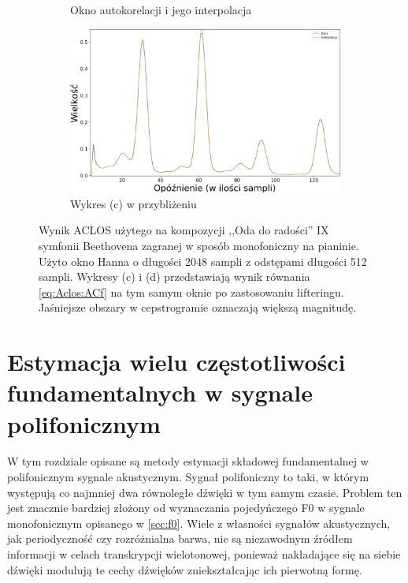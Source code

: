 \documentclass[12pt,a4paper,twoside]{mwart}
\begin{document}
\begin{figure}[H]
\begin{subfigure}{0.5\textwidth}
    \caption{Okno autokorelacji i jego interpolacja}
  \end{subfigure}
  \begin{subfigure}{0.49\textwidth}
    \centering
    \includegraphics[width=1.\linewidth]{images/ACLOS/Interpolacja_superzoomed_cropped.png}
    \caption{Wykres (c) w przybliżeniu}
  \end{subfigure}
  \caption{Wynik ACLOS użytego na kompozycji ,,Oda do radości'' IX symfonii Beethovena zagranej w sposób monofoniczny na pianinie. Użyto okno Hanna o długości 2048 sampli z odstępami długości 512 sampli. Wykresy (c) i (d) przedstawiają wynik równania \ref{eq:Aclos:ACf} na tym samym oknie po zastosowaniu lifteringu. Jaśniejsze obszary w cepstrogramie oznaczają większą magnitudę.}
  \label{fig:aclos:results}
\end{figure}

\clearpage

\section{Estymacja wielu częstotliwości fundamentalnych w sygnale polifonicznym}\label{sec:MultiPitch}
W tym rozdziale opisane są metody estymacji składowej fundamentalnej w polifonicznym sygnale akustycznym. Sygnał polifoniczny to taki, w którym występują co najmniej dwa równoległe dźwięki w tym samym czasie. Problem ten jest znacznie bardziej złożony od wyznaczania pojedyńczego F0 w sygnale monofonicznym opisanego w \ref{sec:f0}. Wiele z własności sygnałów akustycznych, jak periodyczność czy rozróżnialna barwa, nie są niezawodnym źródłem informacji w celach transkrypcji wielotonowej, ponieważ nakładające się na siebie dźwięki modulują te cechy dźwięków zniekształcając ich pierwotną formę.
\end{document}
